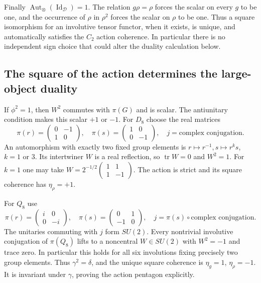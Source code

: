 Finally $\operatorname{Aut}_\otimes(\operatorname{Id}_{\mathcal D})=1$.
The relation $g\rho=\rho$ forces the scalar on every $g$ to be one,
and the occurrence of $\rho$ in $\rho^2$ forces the scalar on $\rho$
to be one. Thus a square isomorphism for an involutive tensor functor,
when it exists, is unique, and automatically satisfies the $C_2$ action
coherence. In particular there is no independent sign choice that could
alter the duality calculation below.

\subsection{The square of the action determines the large-object duality}
If $\phi^2=1$, then $W^2$ commutes with $\pi(G)$ and is scalar.
The antiunitary condition makes this scalar $+1$ or $-1$.
For $D_8$ choose the real matrices
\[
 \pi(r)=\begin{pmatrix}0&-1\\1&0\end{pmatrix},\quad
 \pi(s)=\begin{pmatrix}1&0\\0&-1\end{pmatrix},\quad j=\text{complex conjugation}.
\]
An automorphism with exactly two fixed group elements is
$r\mapsto r^{-1},s\mapsto r^k s$, $k=1$ or $3$.
Its intertwiner $W$ is a real reflection, so $\operatorname{tr}W=0$
and $W^2=1$. For $k=1$ one may take
$W=2^{-1/2}\left(\begin{smallmatrix}1&1\\1&-1\end{smallmatrix}\right)$.
The action is strict and its square coherence has $\eta_\rho=+1$.

For $Q_8$ use
\[
 \pi(r)=\begin{pmatrix}i&0\\0&-i\end{pmatrix},\quad
 \pi(s)=\begin{pmatrix}0&1\\-1&0\end{pmatrix},\quad
 j=\pi(s)\circ\text{complex conjugation}.
\]
The unitaries commuting with $j$ form $SU(2)$. Every nontrivial
involutive conjugation of $\pi(Q_8)$ lifts to a noncentral $W\in SU(2)$
with $W^2=-1$ and trace zero. In particular this holds for all six
involutions fixing precisely two group elements. Thus $\gamma^2=\delta$,
and the unique square coherence is $\eta_g=1$, $\eta_\rho=-1$.
It is invariant under $\gamma$, proving the action pentagon explicitly.

